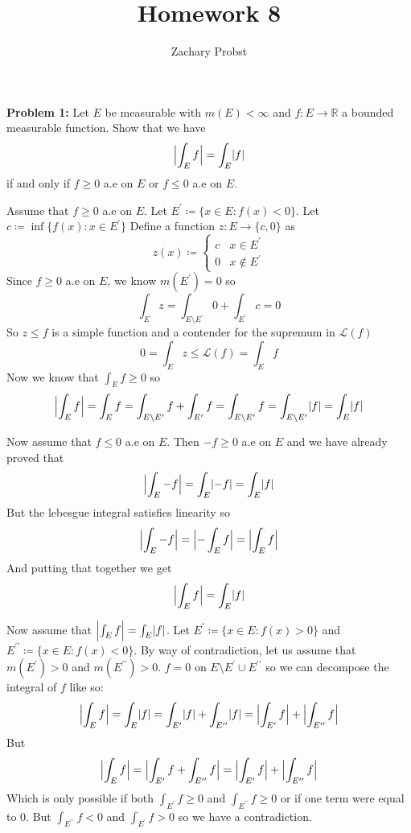 \documentclass[11pt]{article}
\title{Homework 8}
\author{Zachary Probst}
\DeclarePairedDelimiter{\card}{\lvert}{\rvert}
\newcommand{\pr}{^{\prime}}
\newcommand{\dpr}{^{\prime\prime}}
\newcommand{\R}{\mathbb{R}}
\begin{document}
    \maketitle

    \begin{mybox}
        \textbf{Problem 1:} Let $E$ be measurable with $m(E) < \infty$ and $f: E \rightarrow \R$ a bounded measurable function.
        Show that we have
        \[
            \card[\Big]{\int_{E} f } = \int_{E} \card{f}
        \]
        if and only if $f \geq 0$ a.e on $E$ or $f \leq 0$ a.e on $E$.
    \end{mybox}

    Assume that $f \geq 0$ a.e on $E$.
    Let $E\pr \coloneqq \{ x \in E : f(x) < 0 \}$.
    Let $c \coloneqq \inf \{ f(x) : x \in E\pr \}$
    Define a function $z: E \rightarrow \{c,0\}$ as
    \[
        z(x) \coloneqq \begin{cases}
                   c & x \in E\pr \\
                   0 & x \notin E\pr
        \end{cases}
    \]
    Since $f \geq 0$ a.e on $E$, we know $m(E\pr) = 0$ so
    \[
        \int_{E} z = \int_{E \setminus E\pr} 0 + \int_{E\pr} c = 0
    \]
    So $z \leq f$ is a simple function and a contender for the supremum in $\mathcal{L}(f)$
    \[
        0 = \int_{E} z \leq \mathcal{L}(f) = \int_{E} f
    \]
    Now we know that $\int_{E} f \geq 0$ so
    \[
        \card[\Big]{\int_{E} f } = \int_{E} f = \int_{E \setminus E\pr} f + \int_{E\pr} f = \int_{E \setminus E\pr} f = \int_{E \setminus E\pr} \card{f} =  \int_{E} \card{f}
    \]

    Now assume that $f \leq 0$ a.e on $E$.
    Then $-f \geq 0$ a.e on $E$ and we have already proved that
    \[
        \card[\Big]{\int_{E} -f} = \int_{E} \card{-f} = \int_{E} \card{f}
    \]
    But the lebesgue integral satisfies linearity so
    \[
        \card[\Big]{\int_{E} -f} = \card[\Big]{- \int_{E} f } = \card[\Big]{\int_{E} f}
    \]
    And putting that together we get
    \[
        \card[\Big]{\int_{E} f} = \int_{E} \card{f}
    \]

    Now assume that $\card[\Big]{\int_{E} f} = \int_{E} \card{f}$.
    Let $E\pr \coloneqq \{ x \in E : f(x) > 0 \}$ and $E\dpr \coloneqq \{ x \in E : f(x) < 0 \}$.
    By way of contradiction, let us assume that $m(E\pr) > 0$ and $m(E \dpr) > 0$.
    $f = 0$ on $E \setminus E\pr \cup E\dpr$ so we can decompose the integral of $f$ like so:
    \[
        \card[\Big]{\int_{E} f} = \int_{E} \card{f} = \int_{E\pr} \card{f} + \int_{E\dpr} \card{f} = \card[\Big]{\int_{E\pr} f} + \card[\Big]{\int_{E\dpr} f}
    \]
    But
    \[
        \card[\Big]{\int_{E} f} = \card[\Big]{\int_{E\pr} f + \int_{E\dpr} f} = \card[\Big]{\int_{E\pr} f} + \card[\Big]{\int_{E\dpr} f}
    \]
    Which is only possible if both $\int_{E\pr} f \geq 0$ and $\int_{E\dpr} f \geq 0$ or if one term were equal to 0.
    But $\int_{E\dpr} f < 0 $ and $\int_{E\pr} f > 0 $ so we have a contradiction.
\end{document}
